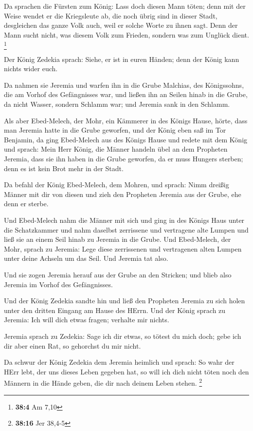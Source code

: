  Da sprachen die Fürsten zum König: Lass doch diesen Mann
töten; denn mit der Weise wendet er die Kriegsleute ab, die noch übrig
sind in dieser Stadt, desgleichen das ganze Volk auch, weil er solche
Worte zu ihnen sagt. Denn der Mann sucht nicht, was diesem Volk zum
Frieden, sondern was zum Unglück dient. \footnote{\textbf{38:4} Am 7,10}

 Der König Zedekia sprach: Siehe, er ist in euren Händen;
denn der König kann nichts wider euch.

 Da nahmen sie Jeremia und warfen ihn in die Grube Malchias,
des Königssohns, die am Vorhof des Gefängnisses war, und ließen ihn an
Seilen hinab in die Grube, da nicht Wasser, sondern Schlamm war; und
Jeremia sank in den Schlamm.

 Als aber Ebed-Melech, der Mohr, ein Kämmerer in des Königs
Hause, hörte, dass man Jeremia hatte in die Grube geworfen, und der
König eben saß im Tor Benjamin,  da ging Ebed-Melech aus des
Königs Hause und redete mit dem König und sprach:  Mein Herr
König, die Männer handeln übel an dem Propheten Jeremia, dass sie ihn
haben in die Grube geworfen, da er muss Hungers sterben; denn es ist
kein Brot mehr in der Stadt.

 Da befahl der König Ebed-Melech, dem Mohren, und sprach:
Nimm dreißig Männer mit dir von diesen und zieh den Propheten Jeremia
aus der Grube, ehe denn er sterbe.

 Und Ebed-Melech nahm die Männer mit sich und ging in des
Königs Haus unter die Schatzkammer und nahm daselbst zerrissene und
vertragene alte Lumpen und ließ sie an einem Seil hinab zu Jeremia in
die Grube.  Und Ebed-Melech, der Mohr, sprach zu Jeremia:
Lege diese zerrissenen und vertragenen alten Lumpen unter deine Achseln
um das Seil. Und Jeremia tat also.

 Und sie zogen Jeremia herauf aus der Grube an den
Stricken; und blieb also Jeremia im Vorhof des Gefängnisses.

 Und der König Zedekia sandte hin und ließ den Propheten
Jeremia zu sich holen unter den dritten Eingang am Hause des HErrn. Und
der König sprach zu Jeremia: Ich will dich etwas fragen; verhalte mir
nichts.

 Jeremia sprach zu Zedekia: Sage ich dir etwas, so tötest
du mich doch; gebe ich dir aber einen Rat, so gehorchst du mir nicht.

 Da schwur der König Zedekia dem Jeremia heimlich und
sprach: So wahr der HErr lebt, der uns dieses Leben gegeben hat, so will
ich dich nicht töten noch den Männern in die Hände geben, die dir nach
deinem Leben stehen. \footnote{\textbf{38:16} Jer 38,4-5}

